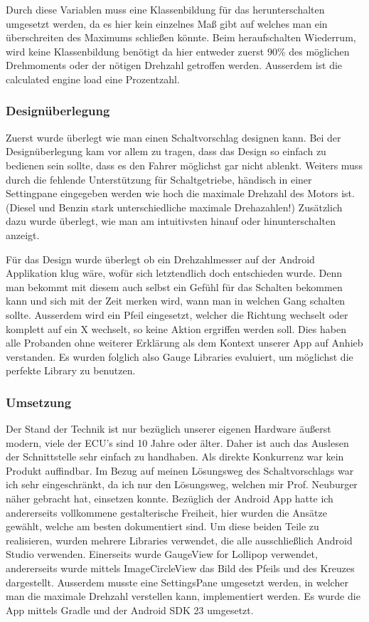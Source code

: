 Durch diese Variablen muss eine Klassenbildung für das herunterschalten umgesetzt werden, da es hier kein einzelnes Maß gibt auf welches man ein überschreiten des Maximums schließen könnte. Beim heraufschalten Wiederrum, wird keine Klassenbildung benötigt da hier entweder zuerst 90\% des möglichen Drehmoments oder der nötigen Drehzahl getroffen werden. Ausserdem ist die calculated engine load eine Prozentzahl. 

\subsubsection{Designüberlegung}
Zuerst wurde überlegt wie man einen Schaltvorschlag designen kann. 
Bei der Designüberlegung kam vor allem zu tragen, dass das Design so einfach zu bedienen sein sollte, dass es den Fahrer möglichst gar nicht ablenkt. Weiters muss durch die fehlende Unterstützung für Schaltgetriebe, händisch in einer Settingpane eingegeben werden wie hoch die maximale Drehzahl des Motors ist. (Diesel und Benzin stark unterschiedliche maximale Drehazahlen!) Zusätzlich dazu wurde überlegt, wie man am intuitivsten hinauf oder hinunterschalten anzeigt.

Für das Design wurde überlegt ob ein Drehzahlmesser auf der Android Applikation klug wäre, wofür sich letztendlich doch entschieden wurde. Denn man bekommt mit diesem auch selbst ein Gefühl für das Schalten bekommen kann und sich mit der Zeit merken wird, wann man in welchen Gang schalten sollte. Ausserdem wird ein Pfeil eingesetzt, welcher die Richtung wechselt oder komplett auf ein X wechselt, so keine Aktion ergriffen werden soll. Dies haben alle Probanden ohne weiterer Erklärung als dem Kontext unserer App auf Anhieb verstanden. Es wurden folglich also Gauge Libraries evaluiert, um möglichst die perfekte Library zu benutzen.

\subsubsection{Umsetzung}
Der Stand der Technik ist nur bezüglich unserer eigenen Hardware äußerst modern, viele der ECU's sind 10 Jahre oder älter. Daher ist auch das Auslesen der Schnittstelle sehr einfach zu handhaben. Als direkte Konkurrenz war kein Produkt auffindbar.
Im Bezug auf meinen Lösungsweg des Schaltvorschlags war ich sehr eingeschränkt, da ich nur den Lösungsweg, welchen mir Prof. Neuburger näher gebracht hat, einsetzen konnte. Bezüglich der Android App hatte ich andererseits vollkommene gestalterische Freiheit, hier wurden die Ansätze gewählt, welche am besten dokumentiert sind.
Um diese beiden Teile zu realisieren, wurden mehrere Libraries verwendet, die alle ausschließlich Android Studio verwenden.
Einerseits wurde GaugeView for Lollipop \cite{SIMR.CH3-schaltvorschlag.GaugeView} verwendet, andererseits wurde mittels ImageCircleView \cite{SIMR.CH3-schaltvorschlag.CircleImageView} das Bild des Pfeils und des Kreuzes dargestellt.
Ausserdem musste eine SettingsPane umgesetzt werden, in welcher man die maximale Drehzahl verstellen kann, implementiert werden.
Es wurde die App mittels Gradle und der Android SDK 23 umgesetzt.

